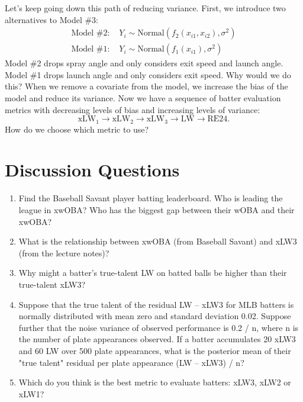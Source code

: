 \documentclass{article}
\begin{document}
    Let's keep going down this path of reducing variance. First, we introduce two alternatives to Model \#3:
    \begin{align*}
      \mbox{Model \#2: }&Y_i \sim \mbox{Normal}\left(f_2(x_{i1}, x_{i2}), \sigma^2\right)\\
      \mbox{Model \#1: }&Y_i \sim \mbox{Normal}\left(f_1(x_{i1}), \sigma^2\right)
    \end{align*}
    Model \#2 drops spray angle and only considers exit speed and launch angle. Model \#1 drops launch angle and only considers exit speed. Why would we do this? When we remove a covariate from the model, we increase the bias of the model and reduce its variance. Now we have a sequence of batter evaluation metrics with decreasing levels of bias and increasing levels of variance:
    \begin{equation*}
      \mbox{xLW}_1 \rightarrow \mbox{xLW}_2 \rightarrow \mbox{xLW}_3 \rightarrow \mbox{LW} \rightarrow \mbox{RE24}.
    \end{equation*}
    How do we choose which metric to use?

    \section{\sc Discussion Questions}

      \begin{enumerate}
        \item Find the Baseball Savant player batting leaderboard. Who is leading the league in xwOBA? Who has the biggest gap between their wOBA and their xwOBA?
        \item What is the relationship between xwOBA (from Baseball Savant) and xLW3 (from the lecture notes)?
        \item Why might a batter's true-talent LW on batted balls be higher than their true-talent xLW3?
        \item Suppose that the true talent of the residual LW -- xLW3 for MLB batters is normally distributed with mean zero and standard deviation 0.02. Suppose further that the noise variance of observed performance is 0.2 / n, where n is the number of plate appearances observed. If a batter accumulates 20 xLW3 and 60 LW over 500 plate appearances, what is the posterior mean of their "true talent" residual per plate appearance (LW -- xLW3) / n?
        \item Which do you think is the best metric to evaluate batters: xLW3, xLW2 or xLW1?
      \end{enumerate}
\end{document}
